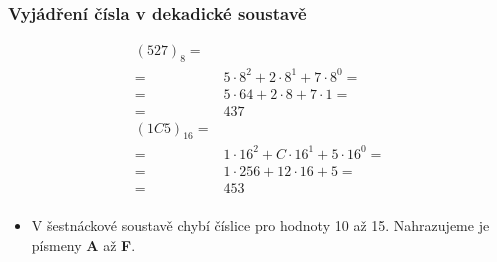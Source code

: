 	\begin{frame}
    \frametitle{Vyjádření čísla v dekadické soustavě}
		
		\begin{minipage}[t][0.6\textheight][t]{\textwidth}
			\boldmath
			\begin{align*}
			(527)_{8} =& \\ 
				=& 5 \cdot 8^2 + 2 \cdot 8^1 + 7 \cdot 8^0 =\\ 
				=& 5 \cdot 64 + 2 \cdot 8 + 7 \cdot 1 =\\
				=& 437\\ 
			(1C5)_{16} =& \\ 
				=& 1 \cdot 16^2 + C \cdot 16^1 + 5 \cdot 16^0 =\\
				=& 1 \cdot 256 + 12 \cdot 16 + 5 =\\ 
				=& 453\\ 
			\end{align*}
		\end{minipage}
		
		\begin{minipage}[t][0.4\textheight][t]{\textwidth}
			\boldmath
			\begin{itemize}
				\item V šestnáckové soustavě chybí číslice pro hodnoty 10 až 15. Nahrazujeme je písmeny \textbf{A} až \textbf{F}.
			\end{itemize}
			
		\end{minipage}
	\end{frame}
	
